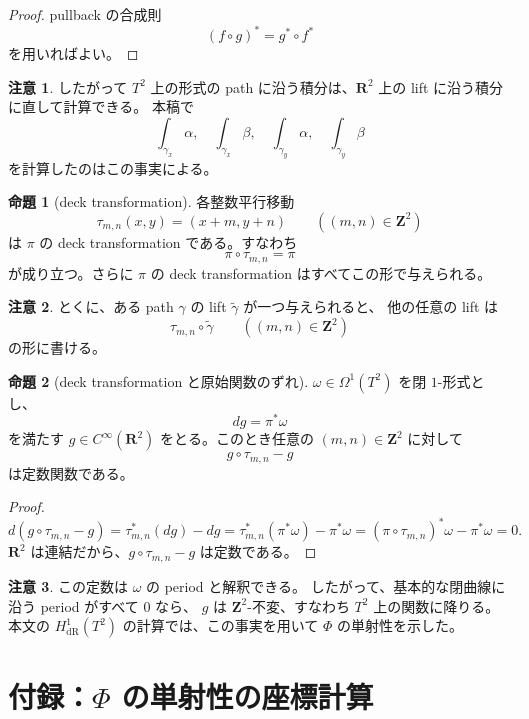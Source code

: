 \documentclass[uplatex,dvipdfmx,11pt]{jsarticle}
\newcommand{\R}{\mathbf{R}}
\newcommand{\Z}{\mathbf{Z}}
\theoremstyle{definition}
\newtheorem{prop}{命題}
\newtheorem{remark}{注意}
\begin{document}
\begin{proof}
pullback の合成則
\[
(f\circ g)^*=g^*\circ f^*
\]
を用いればよい。
\end{proof}

\begin{remark}
したがって \(T^2\) 上の形式の path に沿う積分は、\(\R^2\) 上の lift に沿う積分に直して計算できる。
本稿で
\[
\int_{\gamma_x}\alpha,\quad \int_{\gamma_x}\beta,\quad
\int_{\gamma_y}\alpha,\quad \int_{\gamma_y}\beta
\]
を計算したのはこの事実による。
\end{remark}

\begin{prop}[deck transformation]
各整数平行移動
\[
\tau_{m,n}(x,y)=(x+m,y+n)
\qquad ((m,n)\in\Z^2)
\]
は \(\pi\) の deck transformation である。すなわち
\[
\pi\circ\tau_{m,n}=\pi
\]
が成り立つ。さらに \(\pi\) の deck transformation はすべてこの形で与えられる。
\end{prop}

\begin{remark}
とくに、ある path \(\gamma\) の lift \(\widetilde{\gamma}\) が一つ与えられると、
他の任意の lift は
\[
\tau_{m,n}\circ \widetilde{\gamma}
\qquad ((m,n)\in\Z^2)
\]
の形に書ける。
\end{remark}

\begin{prop}[deck transformation と原始関数のずれ]
\(\omega\in\Omega^1(T^2)\) を閉 \(1\)-形式とし、
\[
dg=\pi^*\omega
\]
を満たす \(g\in C^\infty(\R^2)\) をとる。このとき任意の \((m,n)\in\Z^2\) に対して
\[
g\circ\tau_{m,n}-g
\]
は定数関数である。
\end{prop}

\begin{proof}
\[
d(g\circ\tau_{m,n}-g)
=
\tau_{m,n}^*(dg)-dg
=
\tau_{m,n}^*(\pi^*\omega)-\pi^*\omega
=
(\pi\circ\tau_{m,n})^*\omega-\pi^*\omega
=
0.
\]
\(\R^2\) は連結だから、\(g\circ\tau_{m,n}-g\) は定数である。
\end{proof}

\begin{remark}
この定数は \(\omega\) の period と解釈できる。
したがって、基本的な閉曲線に沿う period がすべて \(0\) なら、
\(g\) は \(\Z^2\)-不変、すなわち \(T^2\) 上の関数に降りる。
本文の \(H^1_{\mathrm{dR}}(T^2)\) の計算では、この事実を用いて
\(\Phi\) の単射性を示した。
\end{remark}

\section*{付録：\(\Phi\) の単射性の座標計算}
\end{document}
